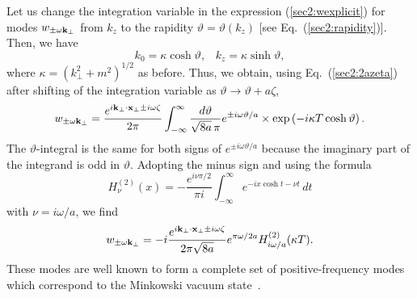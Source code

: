 \documentclass[12pt,nofootinbib,floatfix,aps,prd,showpacs,amsmath,amssymb,eqsecnum]{revtex4-2}
\let\cite\citep
\begin{document}
Let us change the integration variable in the expression
(\ref{sec2:wexplicit}) for modes $w_{\pm \omega {\bf k}_\perp}$
from $k_z$ to the rapidity $\vartheta = \vartheta(k_z)$ 
[see Eq.~(\ref{sec2:rapidity})].
Then, we have
\begin{equation}
k_0  =  \kappa\cosh \vartheta,\;\;\;
k_z  =  \kappa\sinh \vartheta,
\end{equation}
where $\kappa = (k_\perp^2 + m^2)^{1/2}$ as before.
Thus, we obtain, using Eq.~(\ref{sec2:2azeta}) 
after shifting of the integration variable as $\vartheta \to \vartheta +
a\zeta$,
\begin{equation}
w_{\pm\omega{\bf k}_\bot} = \frac{e^{i{\bf k}_\bot\cdot{\bf x}_\bot \pm i\omega\zeta}}{2\pi}
\int_{-\infty}^\infty \frac{d\vartheta}{\sqrt{8a}\,\pi}
e^{\pm i \omega \vartheta/a}
\times
\exp\left( - i\kappa T\cosh\vartheta \right).
\end{equation}
The $\vartheta$-integral is the same for both signs of 
$e^{\pm i\omega\vartheta/a}$ 
because the imaginary part of the integrand is odd in
$\vartheta$.  Adopting the minus sign and using the
formula~\cite{Gradshteynbook}
\begin{equation}
H_\nu^{(2)}(x) = - \frac{e^{i\nu\pi/2}}{\pi i}
\int_{-\infty}^\infty e^{-ix\cosh t - \nu t}\, dt
\end{equation}
with $\nu = i\omega/a$, we find
\begin{equation}
w_{\pm\omega{\bf k}_\bot} =
-i \frac{e^{i{\bf k}_\bot\cdot{\bf x}_\bot 
\pm i\omega\zeta}}{2\pi\sqrt{8a}}e^{\pi\omega/2a}
H_{i\omega/a}^{(2)}(\kappa T).
\end{equation}
These modes are well known to form a complete set of positive-frequency
modes which correspond to the Minkowski vacuum
state~\cite{Fullingetal74}.
\end{document}
